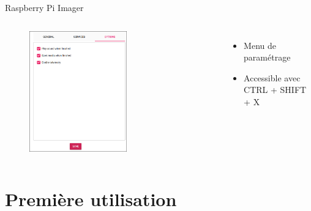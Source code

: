 \documentclass[aspectratio=169,xcolor=dvipsnames]{beamer}
\begin{document}
\begin{frame}{Raspberry Pi Imager}
    \begin{columns}[c] %

        \begin{figure}
            \includegraphics[width=0.6\textwidth]{images/rpi-imager-3.png}
        \end{figure}

        \begin{itemize}
            \item Menu de paramétrage
            \item Accessible avec CTRL + SHIFT + X
        \end{itemize}

    \end{columns}
\end{frame}

\section{Première utilisation}
\end{document}
